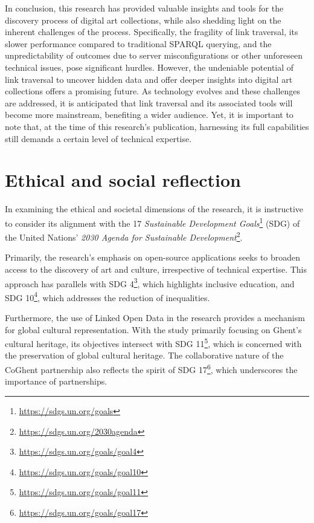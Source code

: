 In conclusion, this research has provided valuable insights and tools for the discovery process of digital art collections, while also shedding light on the inherent challenges of the process. Specifically, the fragility of link traversal, its slower performance compared to traditional SPARQL querying, and the unpredictability of outcomes due to server misconfigurations or other unforeseen technical issues, pose significant hurdles. However, the undeniable potential of link traversal to uncover hidden data and offer deeper insights into digital art collections offers a promising future. As technology evolves and these challenges are addressed, it is anticipated that link traversal and its associated tools will become more mainstream, benefiting a wider audience. Yet, it is important to note that, at the time of this research's publication, harnessing its full capabilities still demands a certain level of technical expertise.

\section*{Ethical and social reflection}

In examining the ethical and societal dimensions of the research, it is instructive to consider its alignment with the 17 \textit{Sustainable Development Goals}\footnote{\url{https://sdgs.un.org/goals}} (SDG) of the United Nations' \textit{2030 Agenda for Sustainable Development}\footnote{\url{https://sdgs.un.org/2030agenda}}.

Primarily, the research's emphasis on open-source applications seeks to broaden access to the discovery of art and culture, irrespective of technical expertise. This approach has parallels with SDG 4\footnote{\url{https://sdgs.un.org/goals/goal4}}, which highlights inclusive education, and SDG 10\footnote{\url{https://sdgs.un.org/goals/goal10}}, which addresses the reduction of inequalities.

Furthermore, the use of Linked Open Data in the research provides a mechanism for global cultural representation. With the study primarily focusing on Ghent's cultural heritage, its objectives intersect with SDG 11\footnote{\url{https://sdgs.un.org/goals/goal11}}, which is concerned with the preservation of global cultural heritage. The collaborative nature of the CoGhent partnership also reflects the spirit of SDG 17\footnote{\url{https://sdgs.un.org/goals/goal17}}, which underscores the importance of partnerships.

